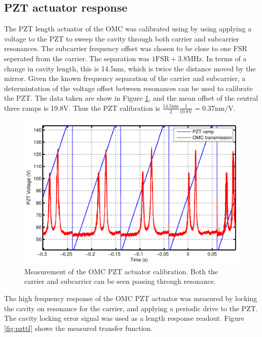 
\subsection{PZT actuator response}
The PZT length actuator of the OMC was calibrated using by using applying a voltage to the PZT to sweep the cavity through both carrier and subcarrier resonances. %
The subcarrier frequency offset was chosen to be close to one FSR seperated from the carrier. %
The separation was $1\mathrm{FSR}+3.8$MHz. %
In terms of a change in cavity length, this is 14.5nm, which is twice the distance moved by the mirror. %
Given the known frequency separation of the carrier and subcarrier, a determintation of the voltage offset between resonances can be used to calibrate the PZT. %
The data taken are show in Figure \ref{fig:pztsweep}, and the mean offset of the central three ramps is 19.8V. %
Thus the PZT calibration is $\frac{14.5\text{nm}}{2}\frac{1}{19.8\text{V}}=0.37\text{nm}/\text{V}$.
\begin{figure}
  \begin{center}
  \leavevmode
  \includegraphics{figs-omc/pztdccal.pdf}
  \end{center}
  \caption[Measurement of the OMC PZT actuator calibration.]{Measurement of the OMC PZT actuator calibration. Both the carrier and subcarrier can be seen passing through resonance.}
  \label{fig:pztsweep}
\end{figure}

The high frequency response of the OMC PZT actuator was measured by locking the cavity on resonance for the carrier, and applying a periodic drive to the PZT. %
The cavity locking error signal was used as a length response readout. %
Figure \ref{fig:pzttf} shows the measured transfer function.

